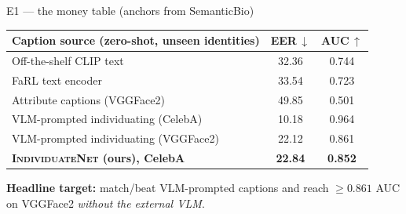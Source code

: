 \documentclass[aspectratio=169,10pt]{beamer}
\newcommand{\method}{\textsc{IndividuateNet}}
\newcommand{\bad}[1]{\textcolor{red!70!black}{#1}}
\begin{document}
\begin{frame}{E1 --- the money table (anchors from SemanticBio)}
  \centering\small
  \begin{tabular}{@{}lcc@{}}
    \toprule
    Caption source (zero-shot, unseen identities) & EER\,$\downarrow$ & AUC\,$\uparrow$ \\
    \midrule
    Off-the-shelf CLIP text            & 32.36 & 0.744 \\
    FaRL text encoder                  & 33.54 & 0.723 \\
    Attribute captions (VGGFace2)      & \bad{49.85} & \bad{0.501} \\
    VLM-prompted individuating (CelebA)& 10.18 & 0.964 \\
    VLM-prompted individuating (VGGFace2)& 22.12 & 0.861 \\
    \midrule
    \textbf{\method{} (ours), CelebA}  & \textbf{22.84} & \textbf{0.852} \\
    \bottomrule
  \end{tabular}
  \vspace{0.8em}

  \footnotesize
  \textbf{Headline target:} match/beat VLM-prompted captions and reach
  $\ge 0.861$ AUC on VGGFace2 \emph{without the external VLM}.
\end{frame}
\end{document}
